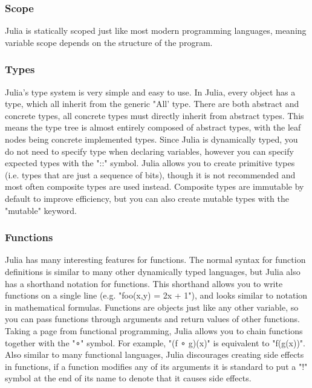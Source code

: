 \documentclass{article}
\begin{document}
\subsubsection{Scope}
Julia is statically scoped just like most modern programming languages, meaning variable scope depends on the structure of the program.

\subsubsection{Types}
Julia's type system is very simple and easy to use. In Julia, every object has a type, which all inherit from the generic "All' type. There are both abstract and concrete types, all concrete types must directly inherit from abstract types. This means the type tree is almost entirely composed of abstract types, with the leaf nodes being concrete implemented types. Since Julia is dynamically typed, you do not need to specify type when declaring variables, however you can specify expected types with the "::" symbol. Julia allows you to create primitive types (i.e. types that are just a sequence of bits), though it is not recommended and most often composite types are used instead. Composite types are immutable by default to improve efficiency, but you can also create mutable types with the "mutable" keyword.

\subsubsection{Functions}
Julia has many interesting features for functions. The normal syntax for function definitions is similar to many other dynamically typed languages, but Julia also has a shorthand notation for functions. This shorthand allows you to write functions on a single line (e.g. "foo(x,y) = 2x + 1"), and looks similar to notation in mathematical formulas. Functions are objects just like any other variable, so you can pass functions through arguments and return values of other functions. Taking a page from functional programming, Julia allows you to chain functions together with the "∘" symbol. For example, "(f ∘ g)(x)" is equivalent to "f(g(x))". Also similar to many functional languages, Julia discourages creating side effects in functions, if a function modifies any of its arguments it is standard to put a "!" symbol at the end of its name to denote that it causes side effects.
\end{document}

